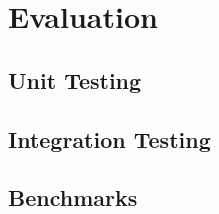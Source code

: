 \chapter{Evaluation} \label{evalandtesting}
\cite{komathukattil_evaluating_nodate}
\section{Unit Testing}
\section{Integration Testing}
\section{Benchmarks}

